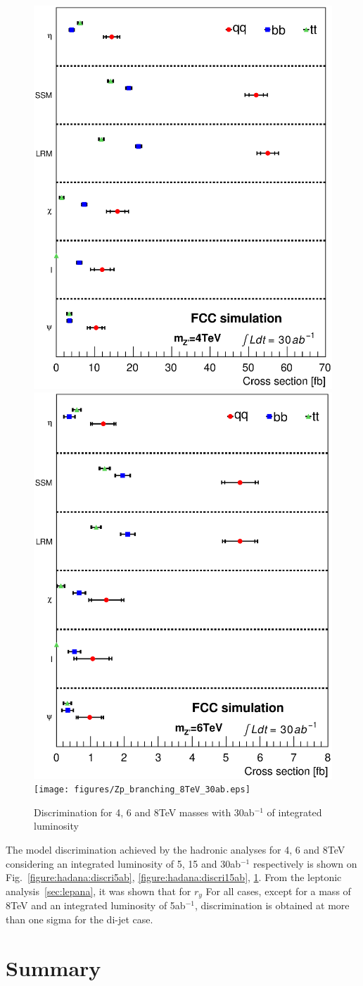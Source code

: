 \documentclass[14pt]{article}
\begin{document}
\begin{figure}[h]
  \centering
    \includegraphics[width=0.45\columnwidth]{figures/Zp_branching_4TeV_30ab.eps}
    \includegraphics[width=0.45\columnwidth]{figures/Zp_branching_6TeV_30ab.eps}
    \texttt{[image: figures/Zp\_branching\_8TeV\_30ab.eps]}
  \caption{Discrimination for 4, 6 and 8TeV masses with 30ab$^{-1}$ of integrated luminosity}
  \label{figure:hadana:discri30ab}
\end{figure}

The model discrimination achieved by the hadronic analyses for 4, 6 and 8TeV considering an integrated luminosity of 
5, 15 and 30ab$^{-1}$ respectively is shown on Fig.~\ref{figure:hadana:discri5ab}, \ref{figure:hadana:discri15ab}, \ref{figure:hadana:discri30ab}.
From the leptonic analysis~\ref{sec:lepana}, it was shown that for $r_y$ 
For all cases, except for a mass of 8TeV and an integrated luminosity of 5ab$^{-1}$, discrimination is obtained at more than one sigma for the di-jet case.


\section{Summary}
\end{document}

